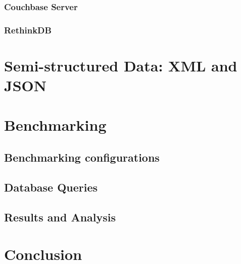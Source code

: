 \documentclass[a4paper,12pt]{book}
\begin{document}
	\subsection{Couchbase Server}\label{intro-couchbase}
	    
	\subsection{RethinkDB}
        			
		
	\chapter{Semi-structured Data: XML and JSON}\label{semi-structure-data}
		
		
	\chapter{Benchmarking}\label{ch:benchmarking} %
	\section{Benchmarking configurations}
	
    \section{Database Queries}
        
    \section{Results and Analysis}
        
	\chapter{Conclusion}\label{conc} 
	    
\end{document}
